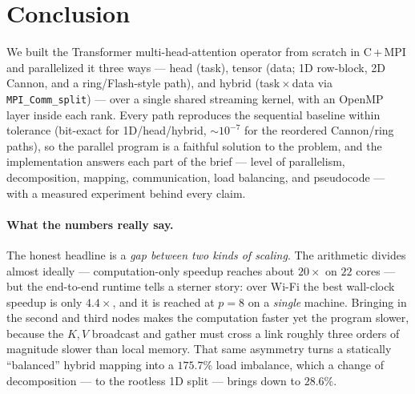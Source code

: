 \documentclass[11pt,a4paper]{article}
\newcommand{\code}[1]{\texttt{#1}}
\begin{document}
\section{Conclusion}
We built the Transformer multi-head-attention operator from scratch in C\,+\,MPI
and parallelized it three ways --- head (task), tensor (data; 1D row-block, 2D
Cannon, and a ring/Flash-style path), and hybrid (task\,$\times$\,data via
\code{MPI\_Comm\_split}) --- over a single shared streaming kernel, with an OpenMP
layer inside each rank. Every path reproduces the sequential baseline within
tolerance (bit-exact for 1D/head/hybrid, $\sim\!10^{-7}$ for the reordered
Cannon/ring paths), so the parallel program is a faithful solution to the problem,
and the implementation answers each part of the brief --- level of parallelism,
decomposition, mapping, communication, load balancing, and pseudocode --- with a
measured experiment behind every claim.

\paragraph{What the numbers really say.} The honest headline is a \emph{gap between
two kinds of scaling}. The arithmetic divides almost ideally --- computation-only
speedup reaches about $20\times$ on $22$ cores --- but the end-to-end runtime tells
a sterner story: over Wi-Fi the best wall-clock speedup is only $4.4\times$, and it
is reached at $p=8$ on a \emph{single} machine. Bringing in the second and third
nodes makes the computation faster yet the program slower, because the $K,V$
broadcast and gather must cross a link roughly three orders of magnitude slower than
local memory. That same asymmetry turns a statically ``balanced'' hybrid mapping
into a $175.7\%$ load imbalance, which a change of decomposition --- to the
rootless 1D split --- brings down to $28.6\%$.
\end{document}
